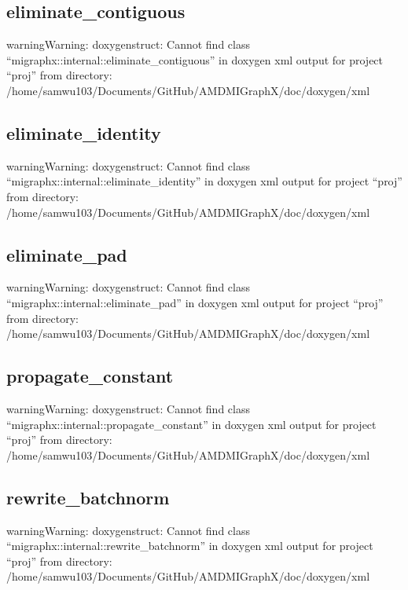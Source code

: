 \documentclass[letterpaper,10pt,english]{sphinxmanual}
\begin{document}
\subsection{eliminate\_contiguous}
\label{\detokenize{dev/pass:eliminate-contiguous}}
\begin{sphinxadmonition}{warning}{Warning:}
\sphinxAtStartPar
doxygenstruct: Cannot find class “migraphx::internal::eliminate\_contiguous” in doxygen xml output for project “proj” from directory: /home/samwu103/Documents/GitHub/AMDMIGraphX/doc/doxygen/xml
\end{sphinxadmonition}


\subsection{eliminate\_identity}
\label{\detokenize{dev/pass:eliminate-identity}}
\begin{sphinxadmonition}{warning}{Warning:}
\sphinxAtStartPar
doxygenstruct: Cannot find class “migraphx::internal::eliminate\_identity” in doxygen xml output for project “proj” from directory: /home/samwu103/Documents/GitHub/AMDMIGraphX/doc/doxygen/xml
\end{sphinxadmonition}


\subsection{eliminate\_pad}
\label{\detokenize{dev/pass:eliminate-pad}}
\begin{sphinxadmonition}{warning}{Warning:}
\sphinxAtStartPar
doxygenstruct: Cannot find class “migraphx::internal::eliminate\_pad” in doxygen xml output for project “proj” from directory: /home/samwu103/Documents/GitHub/AMDMIGraphX/doc/doxygen/xml
\end{sphinxadmonition}


\subsection{propagate\_constant}
\label{\detokenize{dev/pass:propagate-constant}}
\begin{sphinxadmonition}{warning}{Warning:}
\sphinxAtStartPar
doxygenstruct: Cannot find class “migraphx::internal::propagate\_constant” in doxygen xml output for project “proj” from directory: /home/samwu103/Documents/GitHub/AMDMIGraphX/doc/doxygen/xml
\end{sphinxadmonition}


\subsection{rewrite\_batchnorm}
\label{\detokenize{dev/pass:rewrite-batchnorm}}
\begin{sphinxadmonition}{warning}{Warning:}
\sphinxAtStartPar
doxygenstruct: Cannot find class “migraphx::internal::rewrite\_batchnorm” in doxygen xml output for project “proj” from directory: /home/samwu103/Documents/GitHub/AMDMIGraphX/doc/doxygen/xml
\end{sphinxadmonition}
\end{document}
